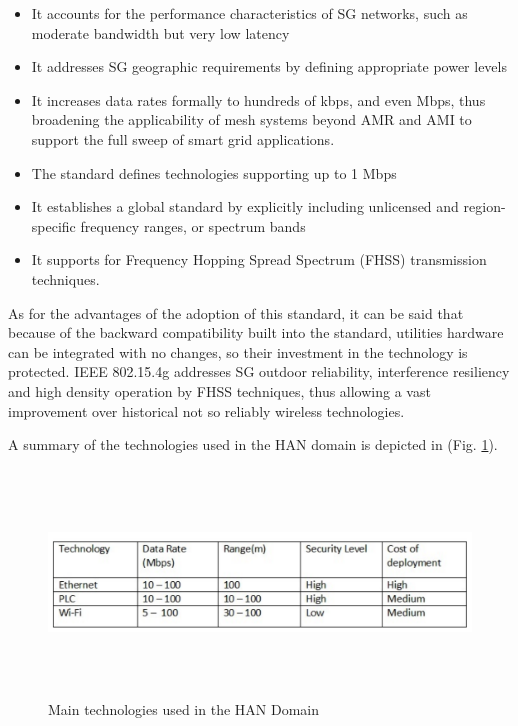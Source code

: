 \documentclass[11pt,final,onecolumn]{IEEEtran}
\begin{document}
\begin{itemize}
	\item It accounts for the performance characteristics of SG networks, such as moderate bandwidth but very low latency
	\item It addresses SG geographic requirements by defining appropriate power levels
	\item It increases data rates formally to hundreds of kbps, and even Mbps, thus broadening the applicability of mesh systems beyond AMR and AMI to support the full sweep of smart grid applications. 
	\item The standard defines technologies supporting up to 1 Mbps
	\item It establishes a global standard by explicitly including unlicensed and region-specific frequency ranges, or spectrum bands
	\item It supports for Frequency Hopping Spread Spectrum (FHSS) transmission techniques.

\end{itemize}

As for the advantages of the adoption of this standard, it can be said that because of the backward compatibility built into the standard, utilities hardware can be integrated with no changes, so their investment in the technology is protected. IEEE 802.15.4g addresses SG outdoor reliability, interference resiliency and high density operation by FHSS techniques, thus allowing a vast improvement over historical not so reliably wireless technologies.

A summary of the technologies used in the HAN domain is depicted in  (Fig. \ref{fig:han}).

\begin{figure}[h!]
\centering
\includegraphics [height=6cm] {HANTechnologies}
\caption{Main technologies used in the HAN Domain}
\label{fig:han}
\end{figure}
\end{document}
